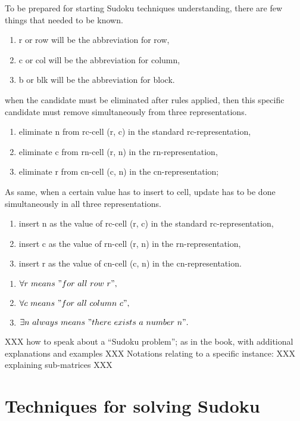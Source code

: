 \documentclass[11pt]{report}
\begin{document}
To be prepared for starting Sudoku techniques understanding, there are few things that needed to be known.
\begin{enumerate}
  \item r or row will be the abbreviation for row,
  \item c or col will be the abbreviation for column,
  \item b or blk will be the abbreviation for block.
\end{enumerate}
when the candidate must be eliminated after rules applied, then this specific candidate must remove simultaneously from three representations.
\begin{enumerate}
  \item eliminate n from rc-cell (r, c) in the standard rc-representation,
  \item eliminate c from rn-cell (r, n) in the rn-representation,
  \item eliminate r from cn-cell (c, n) in the cn-representation;
\end{enumerate}
As same, when a certain value has to insert to cell, update has to be done simultaneously in all three representations.
\begin{enumerate}
  \item insert n as the value of rc-cell (r, c) in the standard rc-representation,
  \item insert c as the value of rn-cell (r, n) in the rn-representation,
  \item insert r as the value of cn-cell (c, n) in the cn-representation.
\end{enumerate}
\begin{enumerate}
  \item $\forall r\ means\ "for\ all\ row\ r",$
  \item $\forall c\ means\ "for\ all\ column\ c",$
  \item $\exists n\ always\ means\ "there\ exists\ a\ number\ n".$
\end{enumerate}

XXX how to speak about a ``Sudoku problem''; as in the book, with additional explanations and examples XXX
Notations relating to a specific instance: XXX explaining sub-matrices XXX








\chapter{Techniques for solving Sudoku}
\label{sec:Techniques}
\end{document}
